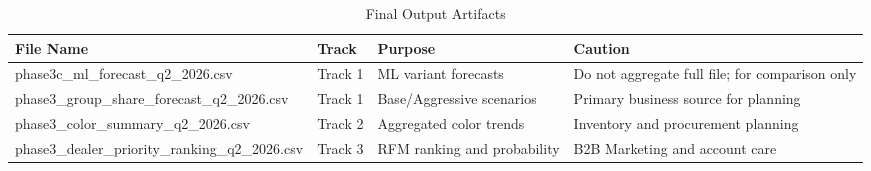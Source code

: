 \begin{table}[htbp]
\centering
\caption{Final Output Artifacts}
\label{tab:final_artifacts}
\begin{tabular}{llll}
\toprule
\textbf{File Name} & \textbf{Track} & \textbf{Purpose} & \textbf{Caution} \\
\midrule
phase3c\_ml\_forecast\_q2\_2026.csv & Track 1 & ML variant forecasts & Do not aggregate full file; for comparison only \\
phase3\_group\_share\_forecast\_q2\_2026.csv & Track 1 & Base/Aggressive scenarios & Primary business source for planning \\
phase3\_color\_summary\_q2\_2026.csv & Track 2 & Aggregated color trends & Inventory and procurement planning \\
phase3\_dealer\_priority\_ranking\_q2\_2026.csv & Track 3 & RFM ranking and probability & B2B Marketing and account care \\
\bottomrule
\end{tabular}
\end{table}

